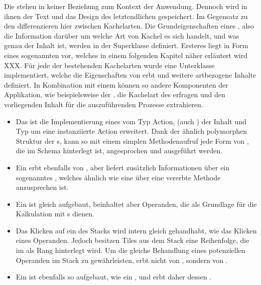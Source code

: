 Die  stehen in keiner Beziehung zum Kontext der Anwendung. Dennoch wird in ihnen der Text und das Design des letztendlichen  gespeichert. Im Gegensatz zu den  differenzieren  hier zwischen Kachelarten. Die Grundeigenschaften eines , also die Information darüber um welche Art von Kachel es sich handelt, und was genau der Inhalt ist, werden in der Superklasse  definiert. Ersteres liegt in Form eines sogenannten  vor, welches in einem folgenden Kapitel näher erläutert wird XXX. Für jede der bestehenden Kachelarten wurde eine Unterklasse implementiert, welche die Eigenschaften von  erbt und weitere artbezogene Inhalte definiert. In Kombination mit einem  können so andere Komponenten der Applikation, wie beispielsweise der , die Kachelart des  erfragen und den vorliegenden Inhalt für die auszuführenden Prozesse extrahieren.

\begin{itemize}
	\item Das  ist die Implementierung eines  vom Typ Action, (auch ) der Inhalt und Typ um eine instanziierte Action erweitert. Dank der ähnlich polymorphen Struktur der s, kann so mit einem simplen Methodenaufruf jede Form von , die im Schema hinterlegt ist, angesprochen und ausgeführt werden.
	\item Ein  erbt ebenfalls von , aber liefert zusätzlich Informationen über ein sogenanntes , welches ähnlich wie eine  über eine vererbte Methode anzusprechen ist.
	\item Ein  ist gleich aufgebaut, beinhaltet aber Operanden, die als Grundlage für die Kalkulation mit s dienen.
	\item Das Klicken auf ein  des Stacks wird intern gleich gehandhabt, wie das Klicken eines Operanden. Jedoch besitzen Tiles aus dem Stack eine Reihenfolge, die im  als Rang hinterlegt wird. Um die gleiche Behandlung eines potenziellen Operanden im Stack zu gewährleisten, erbt  nicht von , sondern von . 
	\item Ein  ist ebenfalls so aufgebaut, wie ein , und erbt daher dessen .
\end{itemize}

